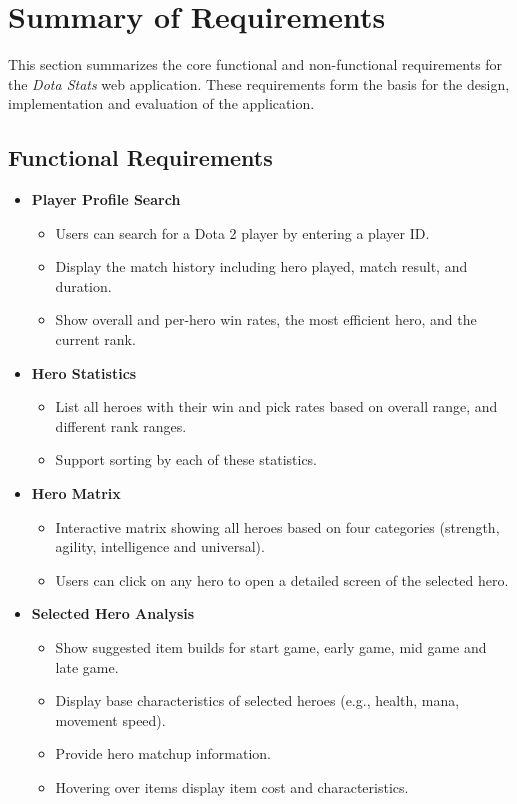 \section{Summary of Requirements}

This section summarizes the core functional and non-functional requirements for the \textit{Dota Stats} web application. These requirements form the basis for the design, implementation and evaluation of the application.

\subsection{Functional Requirements}

\begin{itemize}
    \item \textbf{Player Profile Search}
    \begin{itemize}
        \item Users can search for a Dota 2 player by entering a player ID.
        \item Display the match history including hero played, match result, and duration.
        \item Show overall and per-hero win rates, the most efficient hero, and the current rank.
    \end{itemize}

    \item \textbf{Hero Statistics}
    \begin{itemize}
        \item List all heroes with their win and pick rates based on overall range, and different rank ranges.
        \item Support sorting by each of these statistics.
    \end{itemize}

    \item \textbf{Hero Matrix}
    \begin{itemize}
        \item Interactive matrix showing all heroes based on four categories (strength, agility, intelligence and universal).
        \item Users can click on any hero to open a detailed screen of the selected hero.
    \end{itemize}


    \item \textbf{Selected Hero Analysis}
    \begin{itemize}
        \item Show suggested item builds for start game, early game, mid game and late game.
        \item Display base characteristics of selected heroes (e.g., health, mana, movement speed).
        \item Provide hero matchup information.
        \item Hovering over items display item cost and characteristics.
    \end{itemize}
\end{itemize}

